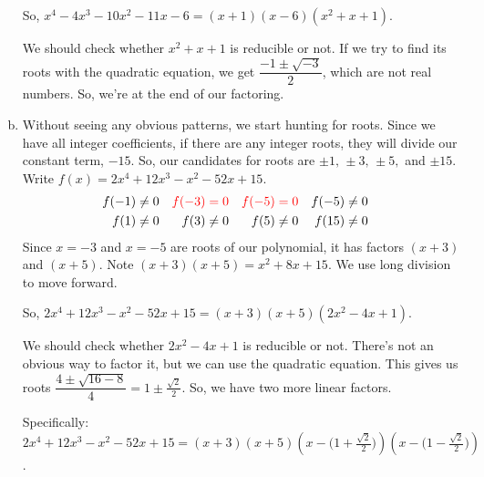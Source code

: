 \begin{solution}
\begin{enumerate}[(a)]
 So, $x^4-4x^3-10x^2-11x-6 = (x+1)(x-6)(x^2+x+1)$.

 We should check whether $x^2+x+1$ is reducible or not. If we try to find its roots with the quadratic equation, we get $\dfrac{-1\pm\sqrt{-3}}{2}$, which are not real numbers. So, we're at the end of our factoring.

 \item Without seeing any obvious patterns, we start hunting for roots. Since we have all integer coefficients, if there are any integer roots, they will divide our constant term, $-15$. So, our candidates for roots are $\pm1,\,\pm3,\,\pm5,$ and $\pm15$.
Write $f(x) = 2x^4  + 12x^3 - x^2 - 52x + 15$.
\begin{align*}
f(-1)&\neq 0&
\color{red}f(-3)&\color{red}=0&
\color{red}f(-5)&\color{red}= 0&
f(-5)&\neq 0\\
f(1)&\neq 0&
f(3)&\neq 0&
f(5)&\neq 0&
f(15)&\neq 0&
\end{align*}
Since $x=-3$ and $x=-5$ are roots of our polynomial, it has factors $(x+3)$ and $(x+5)$. Note $(x+3)(x+5) = x^2+8x+15$. We use long division to move forward.

\begin{center}
 \end{center}

 So, $2x^4+12x^3-x^2-52x+15= (x+3)(x+5)(2x^2-4x+1)$.

 We should check whether $2x^2-4x+1$ is reducible or not. There's not an obvious way to factor it, but we can  use the quadratic equation. This gives us roots
 $\dfrac{4\pm\sqrt{16-8}}{4}=1\pm\frac{\sqrt2}{2}$. So, we have two more linear factors.

Specifically:  $2x^4+12x^3-x^2-52x+15= (x+3)(x+5)\left(x-\Big(1+\frac{\sqrt2}{2}\Big)\right)
                 \left(x-\Big(1-\frac{\sqrt2}{2}\Big)\right)$.

\end{enumerate}

\end{solution}


